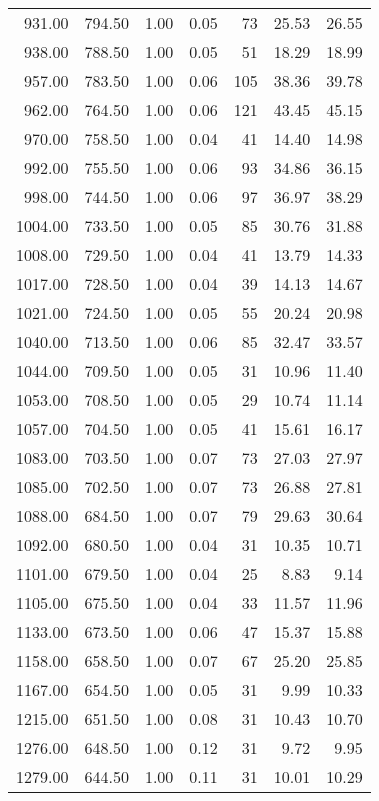 \begin{table}
\begin{tabular}{rrrrrrr}
931.00 & 794.50 & 1.00 & 0.05 & 73 & 25.53 & 26.55 \\
938.00 & 788.50 & 1.00 & 0.05 & 51 & 18.29 & 18.99 \\
957.00 & 783.50 & 1.00 & 0.06 & 105 & 38.36 & 39.78 \\
962.00 & 764.50 & 1.00 & 0.06 & 121 & 43.45 & 45.15 \\
970.00 & 758.50 & 1.00 & 0.04 & 41 & 14.40 & 14.98 \\
992.00 & 755.50 & 1.00 & 0.06 & 93 & 34.86 & 36.15 \\
998.00 & 744.50 & 1.00 & 0.06 & 97 & 36.97 & 38.29 \\
1004.00 & 733.50 & 1.00 & 0.05 & 85 & 30.76 & 31.88 \\
1008.00 & 729.50 & 1.00 & 0.04 & 41 & 13.79 & 14.33 \\
1017.00 & 728.50 & 1.00 & 0.04 & 39 & 14.13 & 14.67 \\
1021.00 & 724.50 & 1.00 & 0.05 & 55 & 20.24 & 20.98 \\
1040.00 & 713.50 & 1.00 & 0.06 & 85 & 32.47 & 33.57 \\
1044.00 & 709.50 & 1.00 & 0.05 & 31 & 10.96 & 11.40 \\
1053.00 & 708.50 & 1.00 & 0.05 & 29 & 10.74 & 11.14 \\
1057.00 & 704.50 & 1.00 & 0.05 & 41 & 15.61 & 16.17 \\
1083.00 & 703.50 & 1.00 & 0.07 & 73 & 27.03 & 27.97 \\
1085.00 & 702.50 & 1.00 & 0.07 & 73 & 26.88 & 27.81 \\
1088.00 & 684.50 & 1.00 & 0.07 & 79 & 29.63 & 30.64 \\
1092.00 & 680.50 & 1.00 & 0.04 & 31 & 10.35 & 10.71 \\
1101.00 & 679.50 & 1.00 & 0.04 & 25 & 8.83 & 9.14 \\
1105.00 & 675.50 & 1.00 & 0.04 & 33 & 11.57 & 11.96 \\
1133.00 & 673.50 & 1.00 & 0.06 & 47 & 15.37 & 15.88 \\
1158.00 & 658.50 & 1.00 & 0.07 & 67 & 25.20 & 25.85 \\
1167.00 & 654.50 & 1.00 & 0.05 & 31 & 9.99 & 10.33 \\
1215.00 & 651.50 & 1.00 & 0.08 & 31 & 10.43 & 10.70 \\
1276.00 & 648.50 & 1.00 & 0.12 & 31 & 9.72 & 9.95 \\
1279.00 & 644.50 & 1.00 & 0.11 & 31 & 10.01 & 10.29 \\
\bottomrule
\end{tabular}
\end{table}
